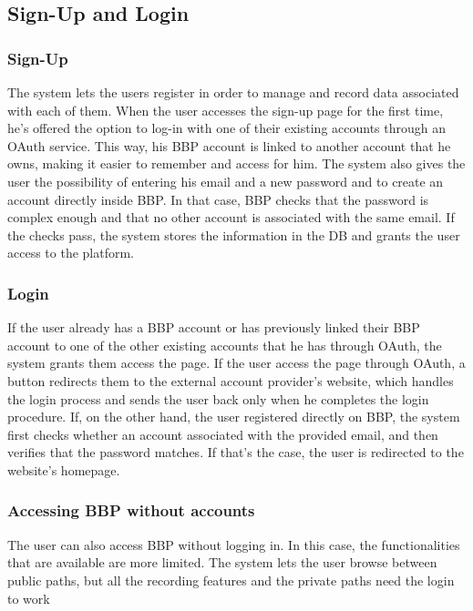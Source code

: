 \subsection*{Sign-Up and Login}
\subsubsection*{Sign-Up}
The system lets the users register in order to manage and record data associated with each of them. When the user accesses the sign-up page for the first time, he’s offered the option to log-in with one of their existing accounts through an OAuth service. This way, his BBP account is linked to another account that he owns, making it easier to remember and access for him. 
The system also gives the user the possibility of entering his email and a new password and to create an account directly inside BBP. In that case, BBP checks that the password is complex enough and that no other account is associated with the same email. If the checks pass, the system stores the information in the DB and grants the user access to the platform.
\subsubsection*{Login}
If the user already has a BBP account or has previously linked their BBP account to one of the other existing accounts that he has through OAuth, the system grants them access the page. If the user access the page through OAuth, a button redirects them to the external account provider’s website, which handles the login process and sends the user back only when he completes the login procedure. If, on the other hand, the user registered directly on BBP, the system first checks whether an account associated with the provided email, and then verifies that the password matches. If that's the case, the user is redirected to the website's homepage.
\subsubsection*{Accessing BBP without accounts}
The user can also access BBP without logging in. In this case, the functionalities that are available are more limited. The system lets the user browse between public paths, but all the recording features and the private paths need the login to work






